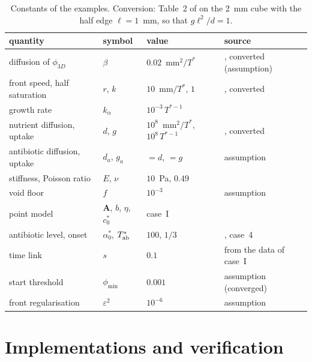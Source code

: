 \documentclass[11pt,a4paper]{article}
\newcommand{\phiD}{\phi_{3D}}
\begin{document}
\begin{table}[tbp]
  \centering
  \caption{Constants of the examples. Conversion: Table~2 of \citet{Klempt2024DiffusionDrivenGrowth} on the 2~mm cube with the half edge $\ell=1$~mm, so that $g\ell^2/d=1$.}
  \label{tab:parameters}
  \footnotesize
  \setlength{\tabcolsep}{4pt}
  \begin{tabular}{lll>{\raggedright\arraybackslash}p{5.2cm}}
    \toprule
    quantity & symbol & value & source \\
    \midrule
    diffusion of $\phiD$ & $\beta$ & $0.02$~mm$^2/T^*$ & \citet{Klempt2024DiffusionDrivenGrowth}, converted (assumption) \\
    front speed, half saturation & $r$, $k$ & $10$~mm$/T^*$, $1$ & \citet{Klempt2024DiffusionDrivenGrowth}, converted \\
    growth rate & $k_\alpha$ & $10^{-3}\,T^{*-1}$ & \citet{Klempt2024DiffusionDrivenGrowth} \\
    nutrient diffusion, uptake & $d$, $g$ & $10^8$~mm$^2/T^*$, $10^8\,T^{*-1}$ & \citet{Klempt2024DiffusionDrivenGrowth}, converted \\
    antibiotic diffusion, uptake & $d_a$, $g_a$ & $=d$, $=g$ & assumption \\
    stiffness, Poisson ratio & $E$, $\nu$ & $10$~Pa, $0.49$ & \citet{Klempt2024DiffusionDrivenGrowth} \\
    void floor & $f$ & $10^{-3}$ & assumption \\
    point model & $\mathbf A$, $b$, $\eta$, $c^*_0$ & case~I & \citet{Fritsch2025BayesianMicrofilms} \\
    antibiotic level, onset & $\alpha^*_0$, $T^*_{\rm ab}$ & $100$, $1/3$ & \citet{Klempt2026ContinuumBacterialGrowth}, case~4 \\
    time link & $s$ & $0.1$ & from the data of case~I \\
    start threshold & $\phi_{\min}$ & $0.001$ & assumption (converged) \\
    front regularisation & $\varepsilon^2$ & $10^{-6}$ & assumption \\
    \bottomrule
  \end{tabular}
\end{table}

\section{Implementations and verification}
\label{sec:verification}
\end{document}
